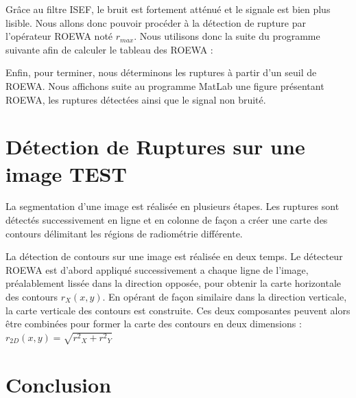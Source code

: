\documentclass[a4paper,11pt]{article}
\newcommand{\FSource}[1]{%
  
  }
\begin{document}
\vspace{0.5cm}

\FSource{matlab/6.m}

\vspace{0.5cm}


Grâce au filtre ISEF, le bruit est fortement atténué et le signale est bien plus lisible. Nous allons donc pouvoir procéder à la détection de rupture par l'opérateur ROEWA noté $r_{max}$. Nous utilisons donc la suite du programme suivante afin de calculer le tableau des ROEWA :

\vspace{0.5cm}

\FSource{matlab/7.m}

\vspace{0.5cm}

Enfin, pour terminer, nous déterminons les ruptures à partir d'un seuil de ROEWA. Nous affichons suite au programme MatLab une figure présentant ROEWA, les ruptures détectées ainsi que le signal non bruité.

\vspace{0.5cm}

\FSource{matlab/8.m}

\vspace{0.5cm}


\newpage

\section{Détection de Ruptures sur une image TEST}

La segmentation d'une image est réalisée en plusieurs étapes. Les ruptures sont détectés
successivement en ligne et en colonne de façon a créer une carte des contours délimitant
les régions de radiométrie différente.

La détection de contours sur une image est réalisée en deux temps. Le détecteur
ROEWA est d'abord appliqué successivement a chaque ligne de l'image, préalablement
lissée dans la direction opposée, pour obtenir la carte horizontale des contours $r_X (x, y)$.
En opérant de façon similaire dans la direction verticale, la carte verticale des contours
est construite. Ces deux composantes peuvent alors être combinées pour former la carte
des contours en deux dimensions : $r_{2D}(x,y)=\sqrt{{r^2}_X+{r^2}_Y}$


\newpage

\section{Conclusion}
\end{document}
